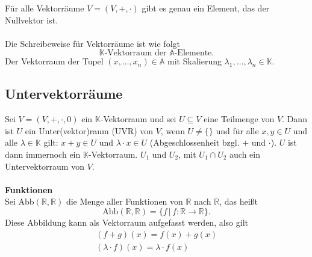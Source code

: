 \documentclass[a4paper,12pt]{article}
\begin{document}
Für alle Vektorräume $V=\left(V,+,\cdot \right)$ gibt es genau ein Element, das der Nullvektor ist.\\\\Die Schreibeweise für Vektorräume ist wie folgt
\[ 
        \mathbb{K}\text{-Vektorraum der $\mathbb{A}$-Elemente}
.\]Der Vektorraum der Tupel $\left(x,\hdots ,x_n\right) \in \mathbb{A}$ mit Skalierung $\lambda _1,\hdots ,\lambda _n  \in \mathbb{K}$. 

\subsection{Untervektorräume}
Sei $V=\left(V,+,\cdot ,0\right)$ ein $\mathbb{K}$-Vektorraum und sei $U\subseteq V$ eine Teilmenge von $V$. Dann ist $U$ ein Unter(vektor)raum (UVR) von $V$, wenn $U\neq \{\}$ und für alle $x,y \in U$ und alle $\lambda  \in \mathbb{K}$ gilt: $x+y \in U$ und $\lambda \cdot x \in U$ (Abgeschlossenheit bzgl. $+$ und $\cdot $). $U$ ist dann immernoch ein $\mathbb{K}$-Vektorraum. $U_1$ und $U_2$, mit $U_1\cap U_2$ auch ein Untervektorraum von $V$.
\\\hfill\\\textbf{Funktionen}\\ 
Sei Abb$\left(\mathbb{R},\mathbb{R}\right)$ die Menge aller Funktionen von $\mathbb{R}$ nach $\mathbb{R}$, das heißt
\[ 
        \text{Abb}\left(\mathbb{R},\mathbb{R}\right)=\{f\,|\, f:\mathbb{R}\rightarrow \mathbb{R}\}
.\] 
Diese Abbildung kann als Vektorraum aufgefasst werden, also gilt
\begin{gather*}
        \left(f+g\right)\left(x\right)=f\left(x\right)+g\left(x\right)\\
        \left(\lambda \cdot f\right)\left(x\right)=\lambda \cdot f\left(x\right)
\end{gather*}
\end{document}
